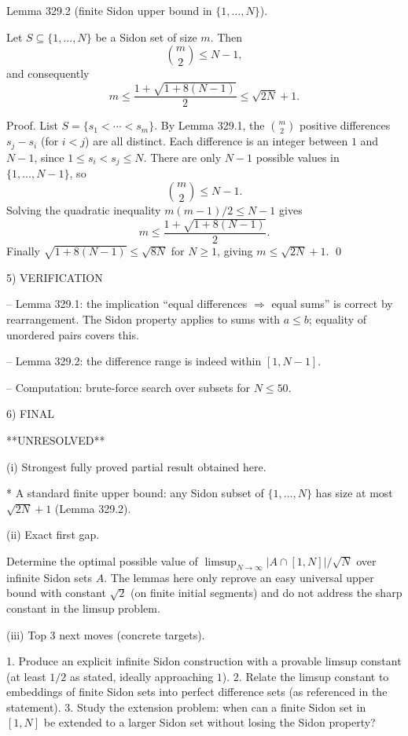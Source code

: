 Lemma 329.2 (finite Sidon upper bound in $\{1,\dots,N\}$).

Let $S\subseteq\{1,\dots,N\}$ be a Sidon set of size $m$.
Then
\[
\binom{m}{2} \le N-1,
\]
and consequently
\[
m \le \frac{1+\sqrt{1+8(N-1)}}{2} \le \sqrt{2N}+1.
\]

Proof.
List $S=\{s_1<\cdots<s_m\}$.
By Lemma 329.1, the $\binom{m}{2}$ positive differences $s_j-s_i$ (for $i<j$) are all distinct.
Each difference is an integer between $1$ and $N-1$, since $1\le s_i<s_j\le N$.
There are only $N-1$ possible values in $\{1,\dots,N-1\}$, so
\[
\binom{m}{2}\le N-1.
\]
Solving the quadratic inequality $m(m-1)/2\le N-1$ gives
\[
m\le \frac{1+\sqrt{1+8(N-1)}}{2}.
\]
Finally $\sqrt{1+8(N-1)}\le \sqrt{8N}$ for $N\ge 1$, giving $m\le \sqrt{2N}+1$.
\qed


5) VERIFICATION

-- Lemma 329.1: the implication ``equal differences $\Rightarrow$ equal sums'' is correct by rearrangement. The Sidon property applies to sums with $a\le b$; equality of unordered pairs covers this.

-- Lemma 329.2: the difference range is indeed within $[1,N-1]$.

-- Computation: brute-force search over subsets for $N\le 50$.


6) FINAL

**UNRESOLVED**

(i) Strongest fully proved partial result obtained here.

* A standard finite upper bound: any Sidon subset of $\{1,\dots,N\}$ has size at most $\sqrt{2N}+1$ (Lemma 329.2).

(ii) Exact first gap.

Determine the optimal possible value of $\limsup_{N\to\infty}|A\cap[1,N]|/\sqrt{N}$ over infinite Sidon sets $A$.
The lemmas here only reprove an easy universal upper bound with constant $\sqrt{2}$ (on finite initial segments) and do not address the sharp constant in the limsup problem.

(iii) Top 3 next moves (concrete targets).

1. Produce an explicit infinite Sidon construction with a provable limsup constant (at least $1/2$ as stated, ideally approaching $1$).
2. Relate the limsup constant to embeddings of finite Sidon sets into perfect difference sets (as referenced in the statement).
3. Study the extension problem: when can a finite Sidon set in $[1,N]$ be extended to a larger Sidon set without losing the Sidon property?

